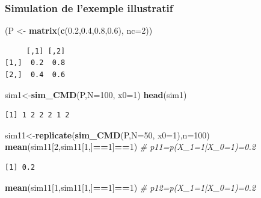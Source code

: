 \documentclass[
]{book}
\newenvironment{Shaded}{\begin{snugshade}}{\end{snugshade}}
\newcommand{\CommentTok}[1]{\textcolor[rgb]{0.56,0.35,0.01}{\textit{#1}}}
\newcommand{\DataTypeTok}[1]{\textcolor[rgb]{0.13,0.29,0.53}{#1}}
\newcommand{\DecValTok}[1]{\textcolor[rgb]{0.00,0.00,0.81}{#1}}
\newcommand{\FloatTok}[1]{\textcolor[rgb]{0.00,0.00,0.81}{#1}}
\newcommand{\KeywordTok}[1]{\textcolor[rgb]{0.13,0.29,0.53}{\textbf{#1}}}
\newcommand{\NormalTok}[1]{#1}
\newcommand{\OperatorTok}[1]{\textcolor[rgb]{0.81,0.36,0.00}{\textbf{#1}}}
\newcommand{\StringTok}[1]{\textcolor[rgb]{0.31,0.60,0.02}{#1}}
\theoremstyle{definition}
\theoremstyle{definition}
\theoremstyle{definition}
\theoremstyle{remark}
\begin{document}
\hypertarget{simulation-de-lexemple-illustratif}{%
\subsubsection{Simulation de l'exemple illustratif}\label{simulation-de-lexemple-illustratif}}

\begin{Shaded}
\begin{Highlighting}[]
\NormalTok{(P <-}\StringTok{ }\KeywordTok{matrix}\NormalTok{(}\KeywordTok{c}\NormalTok{(}\FloatTok{0.2}\NormalTok{,}\FloatTok{0.4}\NormalTok{,}\FloatTok{0.8}\NormalTok{,}\FloatTok{0.6}\NormalTok{), }\DataTypeTok{nc=}\DecValTok{2}\NormalTok{))}
\end{Highlighting}
\end{Shaded}

\begin{verbatim}
     [,1] [,2]
[1,]  0.2  0.8
[2,]  0.4  0.6
\end{verbatim}

\begin{Shaded}
\begin{Highlighting}[]
\NormalTok{sim1<-}\KeywordTok{sim_CMD}\NormalTok{(P,}\DataTypeTok{N=}\DecValTok{100}\NormalTok{, }\DataTypeTok{x0=}\DecValTok{1}\NormalTok{)}
\KeywordTok{head}\NormalTok{(sim1)}
\end{Highlighting}
\end{Shaded}

\begin{verbatim}
[1] 1 2 2 2 1 2
\end{verbatim}

\begin{Shaded}
\begin{Highlighting}[]
\NormalTok{sim11<-}\KeywordTok{replicate}\NormalTok{(}\KeywordTok{sim_CMD}\NormalTok{(P,}\DataTypeTok{N=}\DecValTok{50}\NormalTok{, }\DataTypeTok{x0=}\DecValTok{1}\NormalTok{),}\DataTypeTok{n=}\DecValTok{100}\NormalTok{)}
\KeywordTok{mean}\NormalTok{(sim11[}\DecValTok{2}\NormalTok{,sim11[}\DecValTok{1}\NormalTok{,]}\OperatorTok{==}\DecValTok{1}\NormalTok{]}\OperatorTok{==}\DecValTok{1}\NormalTok{) }\CommentTok{# p11=p(X_1=1|X_0=1)=0.2}
\end{Highlighting}
\end{Shaded}

\begin{verbatim}
[1] 0.2
\end{verbatim}

\begin{Shaded}
\begin{Highlighting}[]
\KeywordTok{mean}\NormalTok{(sim11[}\DecValTok{1}\NormalTok{,sim11[}\DecValTok{1}\NormalTok{,]}\OperatorTok{==}\DecValTok{1}\NormalTok{]}\OperatorTok{==}\DecValTok{1}\NormalTok{) }\CommentTok{# p12=p(X_1=1|X_0=1)=0.2}
\end{Highlighting}
\end{Shaded}
\end{document}

